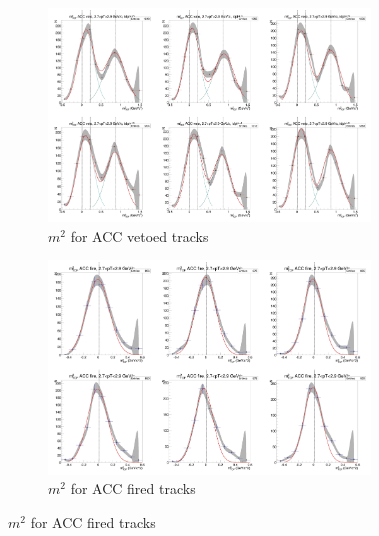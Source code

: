 \begin{figure}[H]
  \ContinuedFloat
    \begin{subfigure}{1\textwidth}
   \centering
   \includegraphics[width=0.94\textwidth]{hiptfits/pos/PSm2_cent0_ich1_accfire0_ptbin11.jpg}
    \caption{$m^2$ for ACC vetoed tracks}
    \end{subfigure}
    \begin{subfigure}{1\textwidth}
   \centering
   \includegraphics[width=0.94\textwidth]{hiptfits/pos/PSm2_cent0_ich1_accfire1_ptbin11.jpg}
    \caption{$m^2$ for ACC fired tracks}
    \end{subfigure}  
\end{figure}
